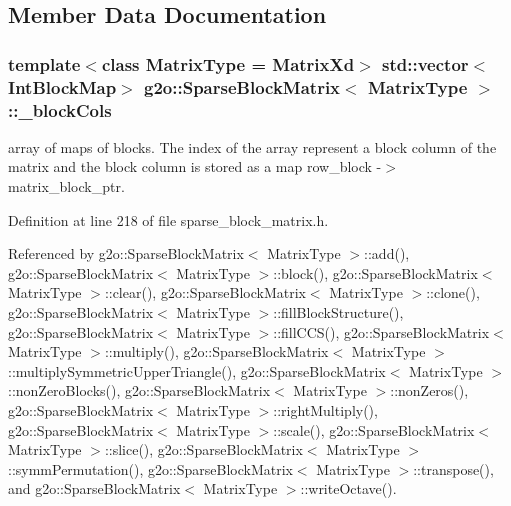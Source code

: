 \subsection{Member Data Documentation}
\subsubsection[{\texorpdfstring{\+\_\+block\+Cols}{_blockCols}}]{\setlength{\rightskip}{0pt plus 5cm}template$<$class Matrix\+Type = Matrix\+Xd$>$ std\+::vector$<${\bf Int\+Block\+Map}$>$ {\bf g2o\+::\+Sparse\+Block\+Matrix}$<$ Matrix\+Type $>$\+::\+\_\+block\+Cols\hspace{0.3cm}{\ttfamily [protected]}}\hypertarget{classg2o_1_1SparseBlockMatrix_ae236d56a01ba4d292450a518621b41f8}{}\label{classg2o_1_1SparseBlockMatrix_ae236d56a01ba4d292450a518621b41f8}
array of maps of blocks. The index of the array represent a block column of the matrix and the block column is stored as a map row\+\_\+block -\/$>$ matrix\+\_\+block\+\_\+ptr. 

Definition at line 218 of file sparse\+\_\+block\+\_\+matrix.\+h.



Referenced by g2o\+::\+Sparse\+Block\+Matrix$<$ Matrix\+Type $>$\+::add(), g2o\+::\+Sparse\+Block\+Matrix$<$ Matrix\+Type $>$\+::block(), g2o\+::\+Sparse\+Block\+Matrix$<$ Matrix\+Type $>$\+::clear(), g2o\+::\+Sparse\+Block\+Matrix$<$ Matrix\+Type $>$\+::clone(), g2o\+::\+Sparse\+Block\+Matrix$<$ Matrix\+Type $>$\+::fill\+Block\+Structure(), g2o\+::\+Sparse\+Block\+Matrix$<$ Matrix\+Type $>$\+::fill\+C\+C\+S(), g2o\+::\+Sparse\+Block\+Matrix$<$ Matrix\+Type $>$\+::multiply(), g2o\+::\+Sparse\+Block\+Matrix$<$ Matrix\+Type $>$\+::multiply\+Symmetric\+Upper\+Triangle(), g2o\+::\+Sparse\+Block\+Matrix$<$ Matrix\+Type $>$\+::non\+Zero\+Blocks(), g2o\+::\+Sparse\+Block\+Matrix$<$ Matrix\+Type $>$\+::non\+Zeros(), g2o\+::\+Sparse\+Block\+Matrix$<$ Matrix\+Type $>$\+::right\+Multiply(), g2o\+::\+Sparse\+Block\+Matrix$<$ Matrix\+Type $>$\+::scale(), g2o\+::\+Sparse\+Block\+Matrix$<$ Matrix\+Type $>$\+::slice(), g2o\+::\+Sparse\+Block\+Matrix$<$ Matrix\+Type $>$\+::symm\+Permutation(), g2o\+::\+Sparse\+Block\+Matrix$<$ Matrix\+Type $>$\+::transpose(), and g2o\+::\+Sparse\+Block\+Matrix$<$ Matrix\+Type $>$\+::write\+Octave().

